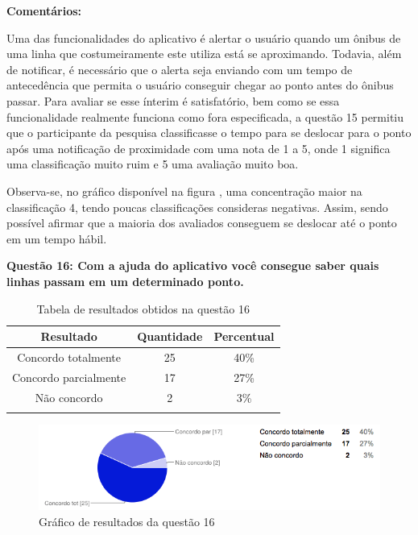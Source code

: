\textbf{Comentários:}

Uma das funcionalidades do aplicativo é alertar o usuário quando um ônibus de uma linha que costumeiramente este utiliza está se aproximando. Todavia, além de notificar, é necessário que o alerta seja enviando com um tempo de antecedência que permita o usuário conseguir chegar ao ponto antes do ônibus passar. Para avaliar se esse ínterim é satisfatório, bem como se essa funcionalidade realmente funciona como fora especificada, a questão 15 permitiu que o participante da pesquisa classificasse o tempo para se deslocar para o ponto após uma notificação de proximidade com uma nota de 1 a 5, onde 1 significa uma classificação muito ruim e 5 uma avaliação muito boa.
	
Observa-se, no gráfico disponível na figura , uma concentração maior na classificação 4, tendo poucas classificações consideras negativas. Assim, sendo possível afirmar que a maioria dos avaliados conseguem se deslocar até o ponto em um tempo hábil.\newline

\textbf{Questão 16: Com a ajuda do aplicativo você consegue saber quais linhas passam em um determinado ponto.}

\begin{center}
\begin{longtable}{c|c|c}
\hline
    \multicolumn{1}{c}{\textbf{Resultado}} & \multicolumn{1}{c}{\textbf{Quantidade}} & \multicolumn{1}{c}{\textbf{Percentual}} \\
\hline
    Concordo totalmente & 25 &  40\%\\
    \hline
    Concordo parcialmente & 17 & 27\%\\
    \hline
     Não concordo & 2 & 3\%\\
    \hline
\caption{Tabela de resultados obtidos na questão 16}
\label{tabq16}
\end{longtable}
\end{center}


\begin{figure}[h]
\begin{center}
  \includegraphics[width=16cm]{images/graficos/questao16.png}
  \caption{Gráfico de resultados da questão 16}
  \label{fig:questao16}
\end{center}
\end{figure}

